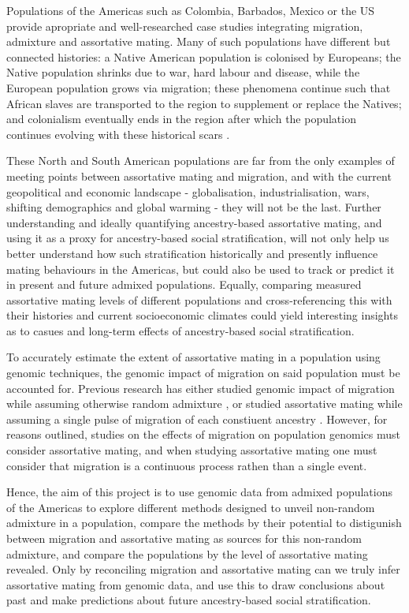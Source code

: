\documentclass[11pt]{article}
\begin{document}
Populations of the Americas such as Colombia, Barbados, Mexico or the US provide apropriate and well-researched case studies integrating migration, admixture and assortative mating. Many of such populations have different but connected histories: a Native American population is colonised by Europeans; the Native population shrinks due to war, hard labour and disease, while the European population grows via migration; these phenomena continue such that African slaves are transported to the region to supplement or replace the Natives; and colonialism eventually ends in the region after which the population continues evolving with these historical scars \parencite{Bryc2010,Mas-Sandoval2019,ESilva2020}. 

These North and South American populations are far from the only examples of meeting points between assortative mating and migration, and with the current geopolitical and economic landscape - globalisation, industrialisation, wars, shifting demographics and global warming - they will not be the last. Further understanding and ideally quantifying ancestry-based assortative mating, and using it as a proxy for ancestry-based social stratification, will not only help us better understand how such stratification historically and presently influence mating behaviours in the Americas, but could also be used to track or predict it in present and future admixed populations. Equally, comparing measured assortative mating levels of different populations and cross-referencing this with their histories and current socioeconomic climates could yield interesting insights as to casues and long-term effects of ancestry-based social stratification. 

To accurately estimate the extent of assortative mating in a population using genomic techniques, the genomic impact of migration on said population must be accounted for. Previous research has either studied genomic impact of migration while assuming otherwise random admixture \parencite{Norris2020,Borda2020,Gravel2012}, or studied assortative mating while assuming a single pulse of migration of each constiuent ancestry \parencite{Norris2019,Risch2009,Zaitlen2017}. However, for reasons outlined, studies on the effects of migration on population genomics must consider assortative mating, and when studying assortative mating one must consider that migration is a continuous process rathen than a single event.

Hence, the aim of this project is to use genomic data from admixed populations of the Americas to explore different methods designed to unveil non-random admixture in a population, compare the methods by their potential to distigunish between migration and assortative mating as sources for this non-random admixture, and compare the populations by the level of assortative mating revealed. Only by reconciling migration and assortative mating can we truly infer assortative mating from genomic data, and use this to draw conclusions about past and make predictions about future ancestry-based social stratification.
\end{document}
